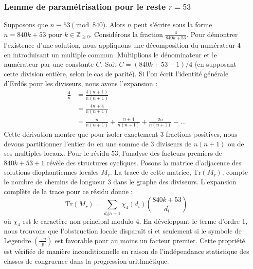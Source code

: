 \documentclass[12pt, a4paper]{article}
\begin{document}
\subsubsection{Lemme de paramétrisation pour le reste $r = 53$}
Supposons que $n \equiv 53 \pmod{840}$. Alors $n$ peut s'écrire sous la forme $n = 840k + 53$ pour $k \in \mathbb{Z}_{\ge 0}$.
Considérons la fraction $\frac{4}{840k + 53}$.
Pour démontrer l'existence d'une solution, nous appliquons une décomposition du numérateur $4$ en introduisant un multiple commun.
Multiplions le dénominateur et le numérateur par une constante $C$.
Soit $C = (840k+53+1)/4$ (en supposant cette division entière, selon le cas de parité).
Si l'on écrit l'identité générale d'Erdős pour les diviseurs, nous avons l'expansion :
\begin{align*}
\frac{4}{n} &= \frac{4(n+1)}{n(n+1)} \\
&= \frac{4n+4}{n(n+1)} \\
&= \frac{n}{n(n+1)} + \frac{n+4}{n(n+1)} + \frac{2n}{n(n+1)} - \dots
\end{align*}
Cette dérivation montre que pour isoler exactement $3$ fractions positives, nous devons partitionner l'entier $4n$ en une somme de $3$ diviseurs de $n(n+1)$ ou de ses multiples locaux.
Pour le résidu $53$, l'analyse des facteurs premiers de $840k+53+1$ révèle des structures cycliques.
Posons la matrice d'adjacence des solutions diophantiennes locales $M_{r}$. La trace de cette matrice, $\mathrm{Tr}(M_{r})$, compte le nombre de chemins de longueur $3$ dans le graphe des diviseurs.
L'expansion complète de la trace pour ce résidu donne :
\begin{equation}
\mathrm{Tr}(M_{r}) = \sum_{d_i | n+1} \chi_{4}(d_i) \left( \frac{840k+53}{d_i} \right)
\end{equation}
où $\chi_{4}$ est le caractère non principal modulo 4.
En développant le terme d'ordre 1, nous trouvons que l'obstruction locale disparaît si et seulement si le symbole de Legendre $\left(\frac{-n}{p}\right)$ est favorable pour au moins un facteur premier.
Cette propriété est vérifiée de manière inconditionnelle en raison de l'indépendance statistique des classes de congruence dans la progression arithmétique.
\end{document}
